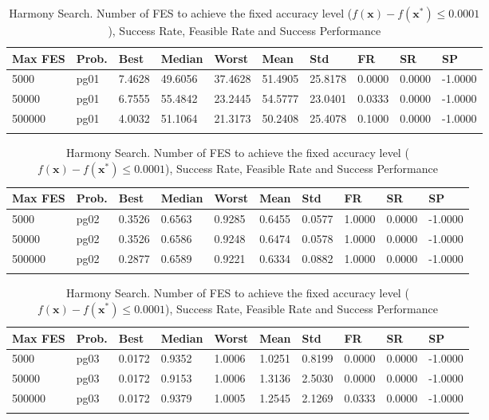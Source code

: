 \documentclass[10pt, a4paper]{book}
\begin{document}
\begin{center}
\begin{longtable}{l l l l l l l l l l}
\textbf{Max FES} & \textbf{Prob.} & \textbf{Best} & \textbf{Median} & \textbf{Worst} & \textbf{Mean} & \textbf{Std} & \textbf{FR} & \textbf{SR} & \textbf{SP} \\
\hline
5000 & pg01 & 7.4628 & 49.6056 & 37.4628 & 51.4905 & 25.8178 & 0.0000 & 0.0000 & -1.0000 \\
50000 & pg01 & 6.7555 & 55.4842 & 23.2445 & 54.5777 & 23.0401 & 0.0333 & 0.0000 & -1.0000 \\
500000 & pg01 & 4.0032 & 51.1064 & 21.3173 & 50.2408 & 25.4078 & 0.1000 & 0.0000 & -1.0000 \\

\caption{ Harmony Search. Number of FES to achieve the fixed accuracy level ($f(\mathbf{x}) - f(\mathbf{x}^{*}) \leq 0.0001$), Success Rate, Feasible Rate and Success Performance }
\end{longtable}
\end{center}

\begin{center}
\begin{longtable}{l l l l l l l l l l}
\textbf{Max FES} & \textbf{Prob.} & \textbf{Best} & \textbf{Median} & \textbf{Worst} & \textbf{Mean} & \textbf{Std} & \textbf{FR} & \textbf{SR} & \textbf{SP} \\
\hline
5000 & pg02 & 0.3526 & 0.6563 & 0.9285 & 0.6455 & 0.0577 & 1.0000 & 0.0000 & -1.0000 \\
50000 & pg02 & 0.3526 & 0.6586 & 0.9248 & 0.6474 & 0.0578 & 1.0000 & 0.0000 & -1.0000 \\
500000 & pg02 & 0.2877 & 0.6589 & 0.9221 & 0.6334 & 0.0882 & 1.0000 & 0.0000 & -1.0000 \\

\caption{ Harmony Search. Number of FES to achieve the fixed accuracy level ($f(\mathbf{x}) - f(\mathbf{x}^{*}) \leq 0.0001$), Success Rate, Feasible Rate and Success Performance }
\end{longtable}
\end{center}

\begin{center}
\begin{longtable}{l l l l l l l l l l}
\textbf{Max FES} & \textbf{Prob.} & \textbf{Best} & \textbf{Median} & \textbf{Worst} & \textbf{Mean} & \textbf{Std} & \textbf{FR} & \textbf{SR} & \textbf{SP} \\
\hline
5000 & pg03 & 0.0172 & 0.9352 & 1.0006 & 1.0251 & 0.8199 & 0.0000 & 0.0000 & -1.0000 \\
50000 & pg03 & 0.0172 & 0.9153 & 1.0006 & 1.3136 & 2.5030 & 0.0000 & 0.0000 & -1.0000 \\
500000 & pg03 & 0.0172 & 0.9379 & 1.0005 & 1.2545 & 2.1269 & 0.0333 & 0.0000 & -1.0000 \\

\caption{ Harmony Search. Number of FES to achieve the fixed accuracy level ($f(\mathbf{x}) - f(\mathbf{x}^{*}) \leq 0.0001$), Success Rate, Feasible Rate and Success Performance }
\end{longtable}
\end{center}
\end{document}
